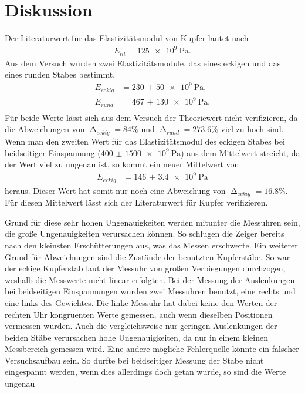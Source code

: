 \section{Diskussion}
\label{sec:Diskussion}

Der Literaturwert für das Elastizitätsmodul von Kupfer lautet nach \cite{czichos}
\begin{align*}
    E_{lit} = \SI{125e9}{\Pa}.
\end{align*}
Aus dem Versuch wurden zwei Elastizitätsmodule, das eines eckigen und das eines runden Stabes bestimmt,
\begin{align*}
    \overline{E_{eckig}} &= \SI{230(50)e9}{\Pa}, \\
    \overline{E_{rund}} &= \SI{467(130)e9}{\Pa}. \\
\end{align*}
Für beide Werte lässt sich aus dem Versuch der Theoriewert nicht verifizieren, da die Abweichungen von
$\upDelta_{eckig} = 84 \%$ und $\upDelta_{rund} = 273.6 \%$ viel zu hoch sind.
Wenn man den zweiten Wert für das Elastizitätsmodul des eckigen Stabes bei beidseitiger Einspannung ($\SI{400(1500)e9}{\Pa}$)
aus dem Mittelwert streicht, da der Wert viel zu ungenau ist, so kommt ein neuer Mittelwert von
\begin{align*}
    \overline{E_{eckig}} &= \SI{146(3.4)e9}{\Pa}
\end{align*}
heraus. Dieser Wert hat somit nur noch eine Abweichung von $\upDelta_{eckig} = 16.8 \%$.
Für diesen Mittelwert lässt sich der Literaturwert für Kupfer verifizieren.

Grund für diese sehr hohen Ungenauigkeiten werden mitunter die Messuhren sein, die große Ungenauigkeiten verursachen können.
So schlugen die Zeiger bereits nach den kleinsten Erschütterungen aus, was das Messen erschwerte. 
Ein weiterer Grund für Abweichungen sind die Zustände der benutzten Kupferstäbe. So war der eckige Kupferstab laut der Messuhr
von großen Verbiegungen durchzogen, weshalb die Messwerte nicht linear erfolgten.
Bei der Messung der Auslenkungen bei beidseitigen Einspannungen wurden zwei Messuhren benutzt, eine rechts und eine links des Gewichtes.
Die linke Messuhr hat dabei keine den Werten der rechten Uhr kongruenten Werte gemessen, auch wenn dieselben Positionen vermessen wurden.
Auch die vergleichsweise nur geringen Auslenkungen der beiden Stäbe verursachen hohe Ungenauigkeiten, da nur in einem
kleinen Messbereich gemessen wird.
Eine andere mögliche Fehlerquelle könnte ein falscher Versuchsaufbau sein. So durfte bei beidseitiger Messung der Stabe nicht
eingespannt werden, wenn dies allerdings doch getan wurde, so sind die Werte ungenau


